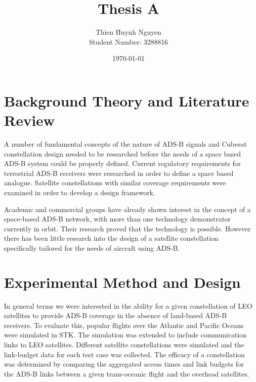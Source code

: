 \documentclass[12pt, a4paper, subeqn]{article}
\title{Thesis A}
\author{Thien Huynh Nguyen\\
	Student Number: 3288816}
\date{\today}
\numberwithin{figure}{section}
\numberwithin{table}{section}
\numberwithin{equation}{section}
\begin{document}
\doublespacing
{}


\tableofcontents
\newpage
\listoffigures
\newpage
\listoftables
\newpage


\fancyhead[L]{\slshape \leftmark}




\part{Background Theory and Literature Review} \label{part:lit_review}
A number of fundamental concepts of the nature of ADS-B signals and Cubesat constellation design needed to be researched before the needs of a space based ADS-B system could be properly defined. Current regulatory requirements for terrestrial ADS-B receivers were researched in order to define a space based analogue. Satellite constellations with similar coverage requirements were examined in order to develop a design framework.

Academic and commercial groups have already shown interest in the concept of a space-based ADS-B network, with more than one technology demonstrator currently in orbit. Their research proved that the technology is possible. However there has been little research into the design of a satellite constellation specifically tailored for the needs of aircraft using ADS-B.  
 



\newpage
\part{Experimental Method and Design}
\label{part:exp_method}
In general terms we were interested in the ability for a given constellation of LEO satellites to provide ADS-B coverage in the absence of land-based ADS-B receivers. To evaluate this, popular flights over the Atlantic and Pacific Oceans were simulated in STK. The simulation was extended to include communication links to LEO satellites. Different satellite constellations were simulated and the link-budget data for each test case was collected. The efficacy of a constellation was determined by comparing the aggregated access times and link budgets for the ADS-B links between a given trans-oceanic flight and the overhead satellites.




\end{document}
